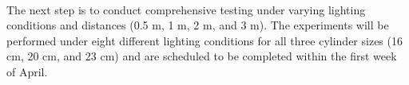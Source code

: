 \paragraph{}
The next step is to conduct comprehensive testing under varying lighting conditions and distances (0.5 m, 1 m, 2 m, and 3 m). The experiments will be performed under eight different lighting conditions for all three cylinder sizes (16 cm, 20 cm, and 23 cm) and are scheduled to be completed within the first week of April.
